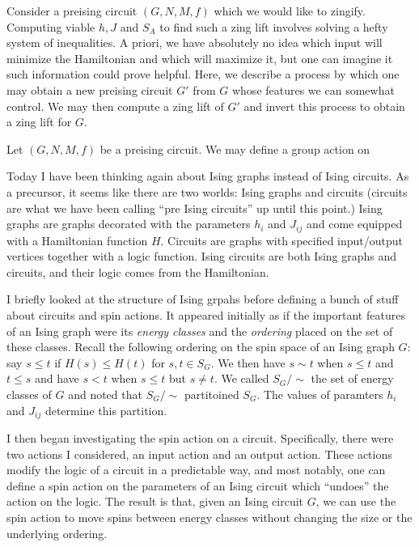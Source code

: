 Consider a preising circuit $(G,N,M,f)$ which we would like to zingify. Computing viable $h,J$ and $S_A$ to find such a zing lift involves solving a hefty system of inequalities. A priori, we have absolutely no idea which input will minimize the Hamiltonian and which will maximize it, but one can imagine it such information could prove helpful. Here, we describe a process by which one may obtain a new preising circuit $G'$ from $G$ whose features we can somewhat control. We may then compute a zing lift of $G'$ and invert this process to obtain a zing lift for $G$.

\begin{defn}\label{defn:spin-action}
	Let $(G,N,M,f)$ be a preising circuit. We may define a group action on 
\end{defn}

Today I have been thinking again about Ising graphs instead of Ising circuits. As a precursor, it seems like there are two worlds: Ising graphs and circuits (circuits are what we have been calling ``pre Ising circuits'' up until this point.) Ising graphs are graphs decorated with the parameters $h_i$ and $J_{ij}$ and come equipped with a Hamiltonian function $H$. Circuits are graphs with specified input/output vertices together with a logic function. Ising circuits are both Ising graphs and circuits, and their logic comes from the Hamiltonian.

I briefly looked at the structure of Ising grpahs before defining a bunch of stuff about circuits and spin actions. It appeared initially as if the important features of an Ising graph were its \emph{energy classes} and the \emph{ordering} placed on the set of these classes. Recall the following ordering on the spin space of an Ising graph $G$: say $s \leq t$ if $H(s) \leq H(t)$ for $s,t \in S_G$. We then have $s\sim t$ when $s \leq t$ and $t \leq s$ and have $s < t$ when $s \leq t$ but $s \neq t$. We called $S_G/\sim$ the set of energy classes of $G$ and noted that $S_G/\sim$ partitoined $S_G$. The values of paramters $h_i$ and $J_{ij}$ determine this partition.

I then began investigating the spin action on a circuit. Specifically, there were two actions I considered, an input action and an output action. These actions modify the logic of a circuit in a predictable way, and most notably, one can define a spin action on the parameters of an Ising circuit which ``undoes'' the action on the logic. The result is that, given an Ising circuit $G$, we can use the spin action to move spins between energy classes without changing the size or the underlying ordering.

